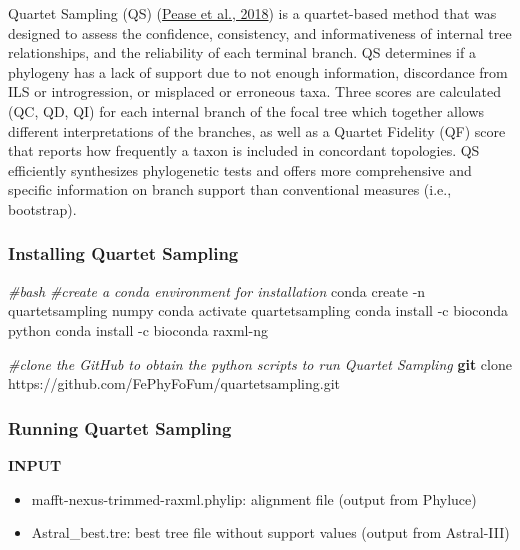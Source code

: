 \documentclass[
  12pt,
]{article}
\newenvironment{Shaded}{\begin{snugshade}}{\end{snugshade}}
\newcommand{\AttributeTok}[1]{\textcolor[rgb]{0.13,0.29,0.53}{#1}}
\newcommand{\CommentTok}[1]{\textcolor[rgb]{0.56,0.35,0.01}{\textit{#1}}}
\newcommand{\ExtensionTok}[1]{#1}
\newcommand{\FunctionTok}[1]{\textcolor[rgb]{0.13,0.29,0.53}{\textbf{#1}}}
\newcommand{\NormalTok}[1]{#1}
\providecommand{\tightlist}{%
  \setlength{\itemsep}{0pt}\setlength{\parskip}{0pt}}
\begin{document}
Quartet Sampling (QS) (\protect\hyperlink{ref-Pease2018}{Pease et al., 2018}) is a quartet-based method that was designed to assess the confidence, consistency, and informativeness of internal tree relationships, and the reliability of each terminal branch. QS determines if a phylogeny has a lack of support due to not enough information, discordance from ILS or introgression, or misplaced or erroneous taxa. Three scores are calculated (QC, QD, QI) for each internal branch of the focal tree which together allows different interpretations of the branches, as well as a Quartet Fidelity (QF) score that reports how frequently a taxon is included in concordant topologies. QS efficiently synthesizes phylogenetic tests and offers more comprehensive and specific information on branch support than conventional measures (i.e., bootstrap).

\hypertarget{installing-quartet-sampling}{%
\subsubsection{Installing Quartet Sampling}\label{installing-quartet-sampling}}

\begin{Shaded}
\begin{Highlighting}[]
\CommentTok{\#bash}
\CommentTok{\#create a conda environment for installation}
\ExtensionTok{conda}\NormalTok{ create }\AttributeTok{{-}n}\NormalTok{ quartetsampling numpy}
\ExtensionTok{conda}\NormalTok{ activate quartetsampling}
\ExtensionTok{conda}\NormalTok{ install }\AttributeTok{{-}c}\NormalTok{ bioconda python}
\ExtensionTok{conda}\NormalTok{ install }\AttributeTok{{-}c}\NormalTok{ bioconda raxml{-}ng }

\CommentTok{\#clone the GitHub to obtain the python scripts to run Quartet Sampling}
\FunctionTok{git}\NormalTok{ clone https://github.com/FePhyFoFum/quartetsampling.git}
\end{Highlighting}
\end{Shaded}

\hypertarget{running-quartet-sampling}{%
\subsubsection{Running Quartet Sampling}\label{running-quartet-sampling}}

\textbf{INPUT}

\begin{itemize}
\tightlist
\item
  mafft-nexus-trimmed-raxml.phylip: alignment file (output from Phyluce)
\item
  Astral\_best.tre: best tree file without support values (output from Astral-III)
\end{itemize}
\end{document}
